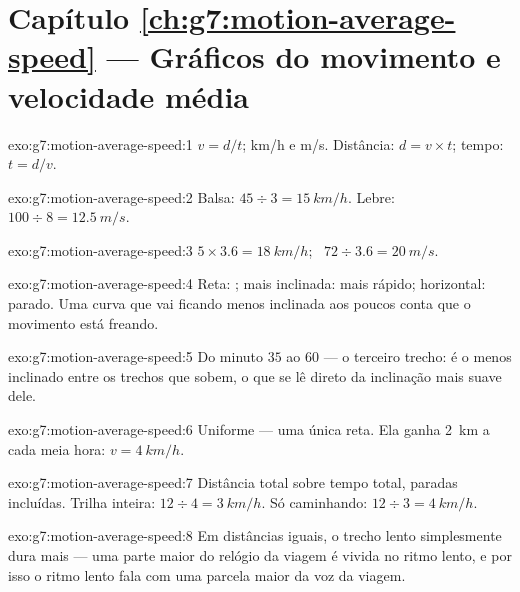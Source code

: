 \section*{Capítulo \ref{ch:g7:motion-average-speed} --- Gráficos do movimento e velocidade média}

\begin{solution}{exo:g7:motion-average-speed:1}
$v = d/t$;  \unit{km/h} e \unit{m/s}. Distância:
$d = v \times t$; tempo: $t = d/v$.
\end{solution}

\begin{solution}{exo:g7:motion-average-speed:2}
Balsa: $45 \div 3 = \qty{15}{km/h}$. Lebre:
$100 \div 8 = \qty{12.5}{m/s}$.
\end{solution}

\begin{solution}{exo:g7:motion-average-speed:3}
$5 \times 3.6 = \qty{18}{km/h}$; \ $72 \div 3.6 = \qty{20}{m/s}$.
\end{solution}

\begin{solution}{exo:g7:motion-average-speed:4}
Reta: ; mais inclinada: mais rápido; horizontal:
parado. Uma curva que vai ficando menos inclinada aos poucos conta que
o movimento está freando.
\end{solution}

\begin{solution}{exo:g7:motion-average-speed:5}
Do minuto $35$ ao $60$ --- o terceiro trecho: é o menos inclinado
entre os trechos que sobem, o que se lê direto da inclinação mais
suave dele.
\end{solution}

\begin{solution}{exo:g7:motion-average-speed:6}
Uniforme --- uma única reta. Ela ganha \qty{2}{km} a cada meia hora:
$v = \qty{4}{km/h}$.
\end{solution}

\begin{solution}{exo:g7:motion-average-speed:7}
Distância total sobre tempo total, paradas incluídas. Trilha
inteira: $12 \div 4 = \qty{3}{km/h}$. Só caminhando:
$12 \div 3 = \qty{4}{km/h}$.
\end{solution}

\begin{solution}{exo:g7:motion-average-speed:8}
Em distâncias iguais, o trecho lento simplesmente dura mais --- uma
parte maior do relógio da viagem é vivida no ritmo lento, e por isso
o ritmo lento fala com uma parcela maior da voz da viagem.
\end{solution}

